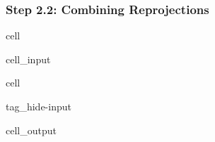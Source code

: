 \documentclass[letterpaper,10pt,english]{jupyterBook}
\begin{document}
\subsubsection{Step 2.2: Combining Reprojections}
\label{\detokenize{algorithm/CIMR_L2_TSA_SCEPS:step-2-2-combining-reprojections}}
\begin{sphinxuseclass}{cell}\begin{sphinxVerbatimInput}

\begin{sphinxuseclass}{cell_input}
\begin{sphinxVerbatim}[commandchars=\\\{\}]
   
\end{sphinxVerbatim}

\end{sphinxuseclass}\end{sphinxVerbatimInput}

\end{sphinxuseclass}
\begin{sphinxuseclass}{cell}
\begin{sphinxuseclass}{tag_hide-input}\begin{sphinxVerbatimOutput}

\begin{sphinxuseclass}{cell_output}
\noindent{}

\end{sphinxuseclass}\end{sphinxVerbatimOutput}

\end{sphinxuseclass}
\end{sphinxuseclass}
\end{document}
